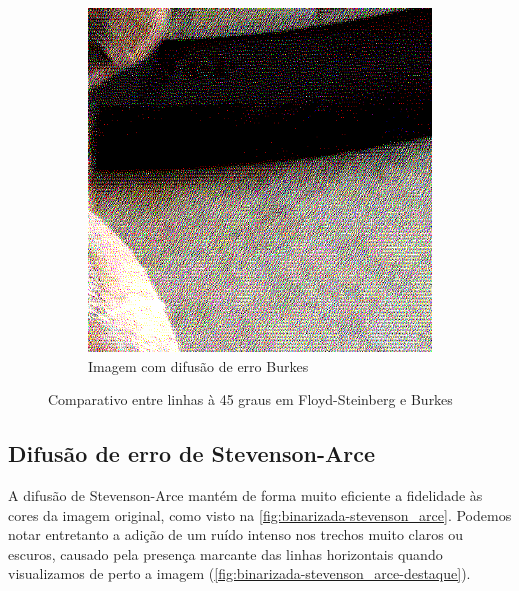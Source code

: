\documentclass[brazilian,a4paper,twocolumn]{article}
\begin{document}
\begin{figure}
\begin{subfigure}{0.24\textwidth}
                \includegraphics[width=\textwidth,keepaspectratio]{../imgs/mel_binarizada-burkes-detalhe1.png}
                \caption{Imagem com difusão de erro Burkes}
            \end{subfigure}

            \caption{Comparativo entre linhas à 45 graus em Floyd-Steinberg e Burkes}
            \label{fig:binarizada-floyd_steinberg-burkes-linhas}
        \end{figure}

    \subsection{Difusão de erro de Stevenson-Arce}

        A difusão de Stevenson-Arce mantém de forma muito eficiente a fidelidade às cores da imagem original, como visto na \cref{fig:binarizada-stevenson_arce}. Podemos notar entretanto a adição de um ruído intenso nos trechos muito claros ou escuros, causado pela presença marcante das linhas horizontais quando visualizamos de perto a imagem (\cref{fig:binarizada-stevenson_arce-destaque}).
\end{document}

